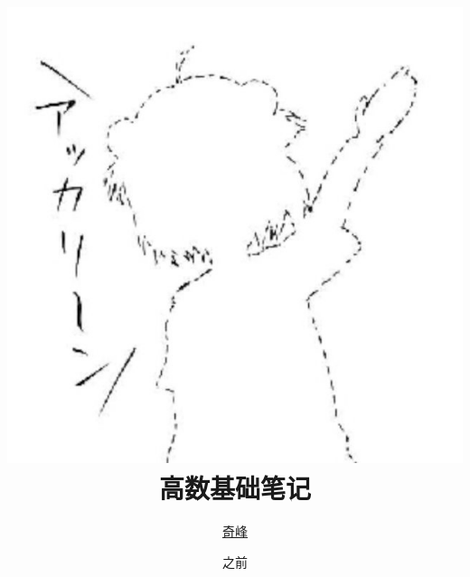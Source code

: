 \documentclass[oneside]{ctexbook}
\title{\includegraphics[scale=0.6]{1.jpg}\\ \textsf{高数基础笔记}}
\author{\href{https://qifengggg.github.io/}{奇峰}}
\date{之前}
\begin{document}
\theoremseparator{}
\newtheorem{def1}{定义}[section]
\newtheorem{theo1}{定理}[section]
\newtheorem{func1}{方法}[section]
\newtheorem{infer1}{推论}[section]
\newenvironment{proof}{\begin{itemize}\item \textbf{证明}
	
	}{\end{itemize}}


\newenvironment{Def}[1][\quad{}]{\begin{def1}\textbf{#1}}{\end{def1}}
\newenvironment{Theo}[1][\quad{}]{\begin{theo1}\textbf{#1}}{\end{theo1}}
\newenvironment{Func}[1][\quad{}]{\begin{func1}\textbf{#1}}{\end{func1}}
\newenvironment{Infer}[1][\quad{}]{\begin{infer1}\textbf{#1}}{\end{infer1}}
\newenvironment{Field}[1][\quad{}]{\noindent\newline\textbf{#1}}{}

\setlength{\parskip}{3pt}

\frontmatter
\maketitle
\hypertarget{Index}{}
\tableofcontents

\mainmatter






%
%

\end{document}
